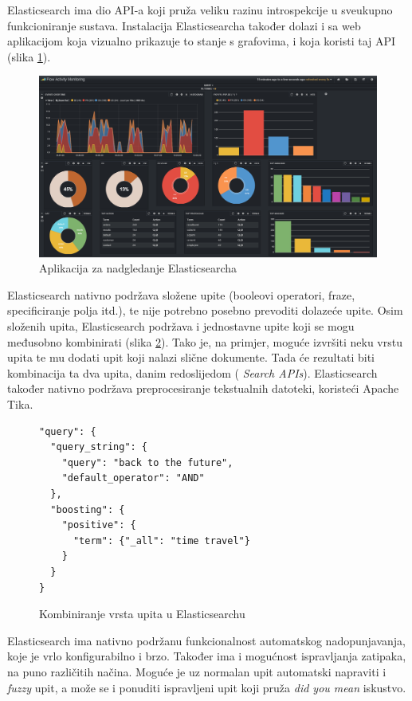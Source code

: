 \documentclass[a4paper,twoside,12pt]{scrreprt}
\begin{document}
Elasticsearch ima dio API-a koji pruža veliku razinu introspekcije u sveukupno funkcioniranje sustava. Instalacija Elasticsearcha također dolazi i sa web aplikacijom koja vizualno prikazuje to stanje s grafovima, i koja koristi taj API (slika \ref{elastic-monitoring}).

\begin{figure}[H]
  \centering
  \includegraphics[width=\textwidth]{elastic-monitoring}
  \caption{Aplikacija za nadgledanje Elasticsearcha}
  \label{elastic-monitoring}
\end{figure}

Elasticsearch nativno podržava složene upite (booleovi operatori, fraze, specificiranje polja itd.), te nije potrebno posebno prevoditi dolazeće upite. Osim složenih upita, Elasticsearch podržava i jednostavne upite koji se mogu međusobno kombinirati (slika \ref{elastic-query}). Tako je, na primjer, moguće izvršiti neku vrstu upita te mu dodati upit koji nalazi slične dokumente. Tada će rezultati biti kombinacija ta dva upita, danim redoslijedom (\cite{elasticref} \textit{Search APIs}). Elasticsearch također nativno podržava preprocesiranje tekstualnih datoteki, koristeći Apache Tika.

\begin{figure}[H]
  \centering
  \begin{Verbatim}[frame=single]
"query": {
  "query_string": {
    "query": "back to the future",
    "default_operator": "AND"
  },
  "boosting": {
    "positive": {
      "term": {"_all": "time travel"}
    }
  }
}
  \end{Verbatim}
  \caption{Kombiniranje vrsta upita u Elasticsearchu}
  \label{elastic-query}
\end{figure}

Elasticsearch ima nativno podržanu funkcionalnost automatskog nadopunjavanja, koje je vrlo konfigurabilno i brzo. Također ima i mogućnost ispravljanja zatipaka, na puno različitih načina. Moguće je uz normalan upit automatski napraviti i \textit{fuzzy} upit, a može se i ponuditi ispravljeni upit koji pruža \textit{did you mean} iskustvo.
\end{document}
